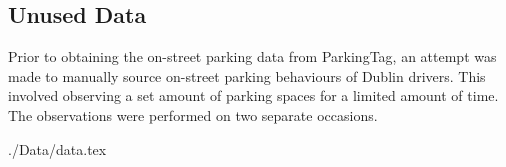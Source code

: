 \subsection{Unused Data}
Prior to obtaining the on-street parking data from ParkingTag, an attempt was made to manually source on-street parking behaviours of Dublin drivers. This involved observing a set amount of parking spaces for a limited amount of time. The observations were performed on two separate occasions.

{./Data/data.tex}